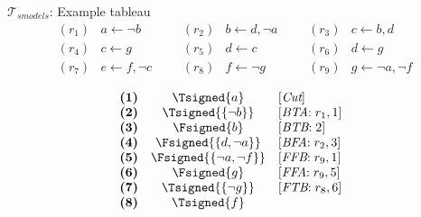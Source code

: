 \begin{frame}{$\mathcal{T}_{\textit{smodels}}$: Example tableau}
\small
\[
\begin{array}{llllllllllll}
(r_1)  &  a \leftarrow \neg b                  & & &
(r_2)  &  b \leftarrow d, \neg a               & & &
(r_3)  &  c \leftarrow b, d                            \\
(r_4)  &  c \leftarrow g                               & & &
(r_5)  &  d \leftarrow c                               & & &
(r_6)  &  d \leftarrow g                               \\
(r_7)  &  e \leftarrow f, \neg c               & & &
(r_8)  &  f \leftarrow \neg g                  & & &
(r_9)  &  g \leftarrow \neg a, \neg f
\end{array}
\]
\begin{center}
\hspace*{-15pt}
\begin{minipage}[t]{16cm}
\tiny
\begin{minipage}[t]{4.5cm}
\[
\hspace{-0.2cm}
\begin{array}{lcl}
\textbf{(1)}                                       &
  \Tsigned{a}                                      &
  [\textit{Cut}]                                   \\
\textbf{(2)}                                       &
  \Tsigned{\{\neg b\}}                     &
  [\textit{BTA}{:}\; r_1, \text{1}]                \\
\textbf{(3)}                                       &
  \Fsigned{b}                                      &
  [\textit{BTB}{:}\; \text{2}]                     \\
\textbf{(4)}                                       &
  \Fsigned{\{d,\neg a\}}                   &
  [\textit{BFA}{:}\;r_2, \text{3}]                 \\
\textbf{(5)}                                       &
  \Fsigned{\{\neg a,\neg f\}}      &
  [\textit{FFB}{:}\;r_9, \text{1}]                 \\
\textbf{(6)}                                       &
  \Fsigned{g}                                      &
  [\textit{FFA}{:}\;r_9, \text{5}]                 \\
\textbf{(7)}                                       &
  \Tsigned{\{\neg g\}}                     &
  [\textit{FTB}{:}\;r_8, \text{6}]                 \\
\textbf{(8)}                                       &
  \Tsigned{f}                                      &

\end{array}\]
\end{minipage}
\end{minipage}
\end{center}
\end{frame}
